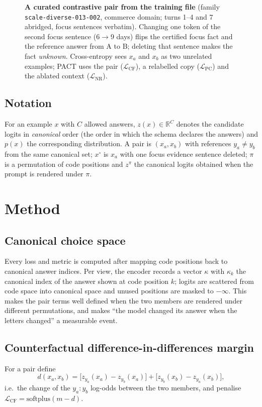 \documentclass[conference]{IEEEtran}
\newcommand{\Lcf}{\mathcal{L}_{\mathrm{CF}}}
\newcommand{\Lpc}{\mathcal{L}_{\mathrm{PC}}}
\newcommand{\Lnr}{\mathcal{L}_{\mathrm{NR}}}
\newcommand{\softplus}{\mathrm{softplus}}
\begin{document}
\begin{figure}[t]
\centering
\resizebox{\textwidth}{!}{}
\caption{\textbf{A curated contrastive pair from the training file} (family
\texttt{scale-diverse-013-002}, commerce domain; turns 1--4 and 7 abridged, focus
sentences verbatim). Changing one token of the second focus sentence (6$\to$9 days)
flips the certified focus fact and the reference answer from A to B; deleting that
sentence makes the fact \emph{unknown}. Cross-entropy sees $x_a$ and $x_b$ as two
unrelated examples; PACT uses the pair ($\Lcf$), a relabelled copy ($\Lpc$) and the
ablated context ($\Lnr$).}
\label{fig:example}
\end{figure}

\subsection{Notation}
\label{sec:notation}
For an example $x$ with $C$ allowed answers, $z(x)\in\mathbb{R}^C$ denotes the
candidate logits in \emph{canonical} order (the order in which the schema
declares the answers) and $p(x)$ the corresponding distribution. A pair is
$(x_a,x_b)$ with references $y_a\neq y_b$ from the same canonical set;
$x^\circ$ is $x_a$ with one focus evidence sentence deleted; $\pi$ is a
permutation of code positions and $z^{\pi}$ the canonical logits obtained when
the prompt is rendered under $\pi$.

\section{Method}
\label{sec:method}

\subsection{Canonical choice space}
\label{sec:canon}
Every loss and metric is computed after mapping code positions back to
canonical answer indices. Per view, the encoder records a vector $\kappa$ with
$\kappa_k$ the canonical index of the answer shown at code position $k$; logits
are scattered from code space into canonical space and unused positions are
masked to $-\infty$. This makes the pair terms well defined when the two
members are rendered under different permutations, and makes ``the model
changed its answer when the letters changed'' a measurable event.

\subsection{Counterfactual difference-in-differences margin}
\label{sec:cf}
For a pair define
\begin{equation}
d(x_a,x_b)=\big[z_{y_a}(x_a)-z_{y_b}(x_a)\big]+\big[z_{y_b}(x_b)-z_{y_a}(x_b)\big],
\label{eq:did}
\end{equation}
i.e.\ the change of the $y_a{:}y_b$ log-odds between the two members, and
penalise $\Lcf=\softplus(m-d)$.
\end{document}
